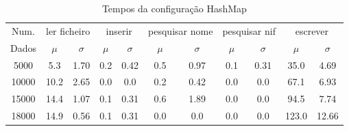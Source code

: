 \documentclass[a5paper,twocolumn, 11pt]{article}
\begin{document}
\clearpage
\onecolumn
    \begin{table}[h!b!t!]
    \begin{center}
    \caption{Tempos da configuração HashMap}
\begin{tabular}{ | *{11}{c|} }
\hline
    Num. & \multicolumn{2}{|c|}{ler ficheiro} & \multicolumn{2}{|c|}{inserir} & \multicolumn{2}{|c|}{pesquisar nome} & \multicolumn{2}{|c|}{pesquisar nif} & \multicolumn{2}{|c|}{escrever}\\ %
    
    Dados & $\mu$ & $\sigma$ & $\mu$ & $\sigma$ & $\mu$ & $\sigma$ & $\mu$ & $\sigma$ & $\mu$ & $\sigma$\\ \hline
    5000 & 5.3 & 1.70 & 0.2 & 0.42 & 0.5 & 0.97 & 0.1 & 0.31 & 35.0 & 4.69\\ \hline
    10000 & 10.2 & 2.65 & 0.0 & 0.0 & 0.2 & 0.42 & 0.0 & 0.0 & 67.1 & 6.93\\ \hline
    15000 & 14.4 & 1.07 & 0.1 & 0.31 & 0.6 & 1.89 & 0.0 & 0.0 & 94.5 & 7.74\\ \hline
    18000 & 14.9 & 0.56 & 0.1 & 0.31 & 0.0 & 0.0 & 0.0 & 0.0 & 123.0 & 12.66\\ \hline
\end{tabular}
\end{center}
\end{table}
\end{document}
